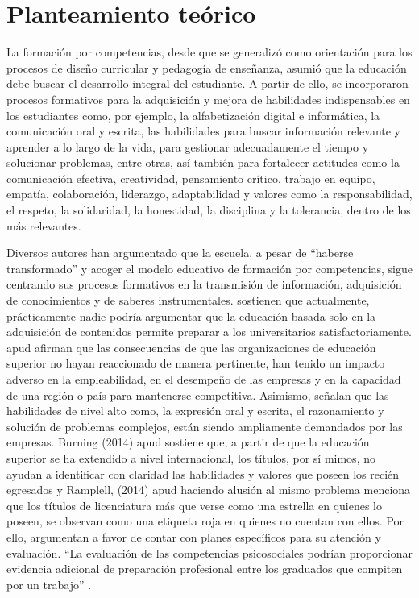 \documentclass{textolivre}
\begin{document}
\section{Planteamiento teórico}
La formación por competencias, desde que se generalizó como orientación para los procesos de diseño curricular y pedagogía de enseñanza, asumió que la educación debe buscar el desarrollo integral del estudiante. A partir de ello, se incorporaron procesos formativos para la adquisición y mejora de habilidades indispensables en los estudiantes como, por ejemplo, la alfabetización digital e informática, la comunicación oral y escrita, las habilidades para buscar información relevante y aprender a lo largo de la vida, para gestionar adecuadamente el tiempo y solucionar problemas, entre otras, así también para fortalecer actitudes como la comunicación efectiva, creatividad, pensamiento crítico, trabajo en equipo, empatía, colaboración, liderazgo, adaptabilidad y valores como la responsabilidad, el respeto, la solidaridad, la honestidad, la disciplina y la tolerancia, dentro de los más relevantes.

Diversos autores \cite{cejasmartinez2019, asuninostroza2013, torres2012, fernandez2010, davis2015} han argumentado que la escuela, a pesar de “haberse transformado” y acoger el modelo educativo de formación por competencias, sigue centrando sus procesos formativos en la transmisión de información, adquisición de conocimientos y de saberes instrumentales. \textcite{oliveri2017} sostienen que actualmente, prácticamente nadie podría argumentar que la educación basada solo en la adquisición de contenidos permite preparar a los universitarios satisfactoriamente. \textcite{coley} apud \textcite[p. 1]{oliveri2017} afirman que las consecuencias de que las organizaciones de educación superior no hayan reaccionado de manera pertinente, han tenido un impacto adverso en la empleabilidad, en el desempeño de las empresas y en la capacidad de una región o país para mantenerse competitiva. Asimismo, señalan que las habilidades de nivel alto como, la expresión oral y escrita, el razonamiento y solución de problemas complejos, están siendo ampliamente demandados por las empresas. Burning (2014) apud \textcite[p. 3]{oliveri2017} sostiene que, a partir de que la educación superior se ha extendido a nivel internacional, los títulos, por sí mimos, no ayudan a identificar con claridad las habilidades y valores que poseen los recién egresados y Ramplell, (2014) apud \textcite[p. 1]{oliveri2017} haciendo alusión al mismo problema menciona que los títulos de licenciatura más que verse como una estrella en quienes lo poseen, se observan como una etiqueta roja en quienes no cuentan con ellos. Por ello, argumentan a favor de contar con planes específicos para su atención y evaluación. “La evaluación de las competencias psicosociales podrían proporcionar evidencia adicional de preparación profesional entre los graduados que compiten por un trabajo” \cite[p. 63]{davis2015}.
\end{document}
